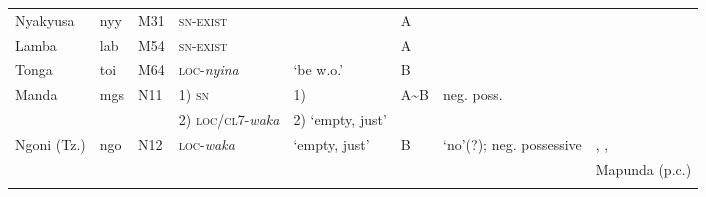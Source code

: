\documentclass[output=paper,draft,draftmode,colorlinks,citecolor=brown]{langscibook}
\begin{document}
\begin{paperappendix}
\begin{sidewaystable}
\begin{tabularx}{\textwidth}{llllllQQ}
{Nyakyusa}&{nyy}	&{M31} 	&\textsc{sn-exist}		&\textendash							&A{}	&												&\citet{Persohn2017}\\
{Lamba}	&{lab}		&{M54} 	&\textsc{sn-exist}		&\textendash							&A{}	&												&\citet{Doke1938}\\
{Tonga}	&{toi}		&{M64}	&\textsc{loc}-\textit{nyina}&`be w.o.' 						&B 		&												&\citet{Collins1962}\\
{Manda} 	&{mgs}	&{N11}	&\textsc{1)} \textsc{sn}&1) \textendash						&A{\textasciitilde}B&neg. poss.								&\citet{Bernander2017}\\
				&				&				&2) \textsc{loc/cl}7-\textit{waka}&2) `empty, just'\\
{Ngoni (Tz.)}&{ngo}	&{N12}	&\textsc{loc}-\textit{waka}&`empty, just'					&B 		&`no'(?); neg. possessive							&\citet{Spiss1904}, \citet{Ngonyani2003},\\
				&				&				&					&									&		&												&Mapunda (p.c.)\\
\lspbottomrule
\end{tabularx}
\end{sidewaystable}


\end{paperappendix}
\end{document}
